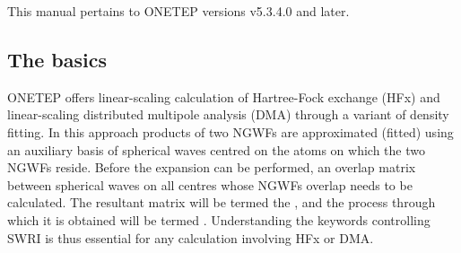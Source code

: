 \documentclass[letterpaper,10pt,english]{sphinxmanual}
\begin{document}
This manual pertains to ONETEP versions v5.3.4.0 and later.


\subsection{The basics}
\label{\detokenize{hfx:the-basics}}
ONETEP offers linear-scaling calculation of Hartree-Fock exchange (HFx)
and linear-scaling distributed multipole analysis (DMA) through a
variant of density fitting. In this approach products of two NGWFs are
approximated (fitted) using an auxiliary basis of spherical waves
centred on the atoms on which the two NGWFs reside. Before the expansion
can be performed, an overlap matrix between spherical waves on all
centres whose NGWFs overlap needs to be calculated. The resultant matrix
will be termed the , and the process through which it is
obtained will be termed .
Understanding the keywords controlling SWRI is thus essential for any
calculation involving HFx or DMA.
\end{document}
